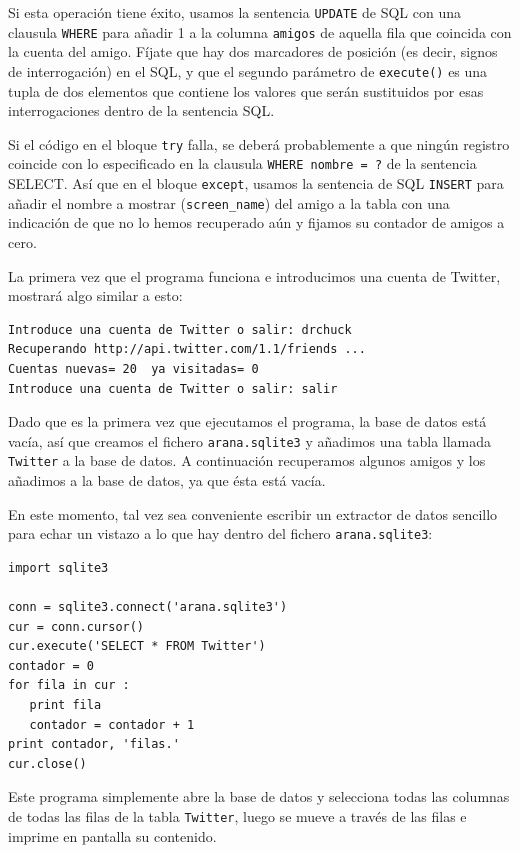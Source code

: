 Si esta operación tiene éxito, usamos la sentencia {\tt UPDATE} de SQL con una
clausula {\tt WHERE} para añadir 1 a la columna {\tt amigos} de aquella fila que
coincida con la cuenta del amigo. Fíjate que hay dos marcadores de posición (es decir,
signos de interrogación) en el SQL, y que el segundo parámetro de {\tt execute()} es
una tupla de dos elementos que contiene los valores que serán sustituidos por esas
interrogaciones dentro de la sentencia SQL.

Si el código en el bloque {\tt try} falla, se deberá probablemente a que ningún registro
coincide con lo especificado en la clausula {\tt WHERE nombre = ?} de la sentencia SELECT.
Así que en el bloque {\tt except}, usamos la sentencia de SQL {\tt INSERT} para añadir el
nombre a mostrar (\verb"screen_name") del amigo a la tabla con una indicación de que no lo hemos
recuperado aún y fijamos su contador de amigos a cero.

La primera vez que el programa funciona e introducimos una cuenta de Twitter, mostrará
algo similar a esto:

\beforeverb
\begin{verbatim}
Introduce una cuenta de Twitter o salir: drchuck
Recuperando http://api.twitter.com/1.1/friends ...
Cuentas nuevas= 20  ya visitadas= 0
Introduce una cuenta de Twitter o salir: salir
\end{verbatim}
\afterverb
%
Dado que es la primera vez que ejecutamos el programa, la base de datos
está vacía, así que creamos el fichero {\tt arana.sqlite3} y añadimos
una tabla llamada {\tt Twitter} a la base de datos. A continuación
recuperamos algunos amigos y los añadimos a la base de datos, ya que
ésta está vacía.

En este momento, tal vez sea conveniente escribir un extractor de datos sencillo
para echar un vistazo a lo que hay dentro del fichero {\tt arana.sqlite3}:

\beforeverb
\begin{verbatim}
import sqlite3

conn = sqlite3.connect('arana.sqlite3')
cur = conn.cursor()
cur.execute('SELECT * FROM Twitter')
contador = 0
for fila in cur :
   print fila
   contador = contador + 1
print contador, 'filas.'
cur.close()
\end{verbatim}
\afterverb
%
Este programa simplemente abre la base de datos y selecciona todas las columnas
de todas las filas de la tabla {\tt Twitter}, luego
se mueve a través de las filas e imprime en pantalla su contenido.

